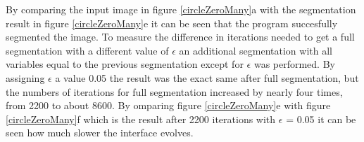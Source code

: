 \clearpage

By comparing the input image in figure \ref{circleZeroMany}a with the segmentation result in figure \ref{circleZeroMany}e it can be seen that the program succesfully segmented the image. To measure the difference in iterations needed to get a full segmentation with a different value of $\epsilon$ an additional segmentation with all variables equal to the previous segmentation except for $\epsilon$ was performed. By assigning $\epsilon$ a value 0.05 the result was the exact same after full segmentation, but the numbers of iterations for full segmentation increased by nearly four times, from 2200 to about 8600. By omparing figure \ref{circleZeroMany}e with figure \ref{circleZeroMany}f which is the result after 2200 iterations with $\epsilon$ = 0.05 it can be seen how much slower the interface evolves.

